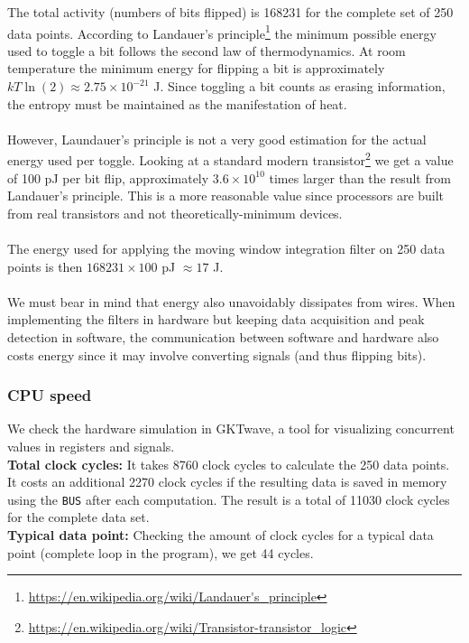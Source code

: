 The total activity (numbers of bits flipped) is 168231 for the complete set of 250 data points. According to Landauer's principle\footnote{\url{https://en.wikipedia.org/wiki/Landauer's_principle}} the minimum possible energy used to toggle a bit follows the second law of thermodynamics. At room temperature the minimum energy for flipping a bit is approximately $kT \ln(2) \approx 2.75 \times 10^{-21}$ J. Since toggling a bit counts as erasing information, the entropy must be maintained as the manifestation of heat. \\
\\
However, Laundauer's principle is not a very good estimation for the actual energy used per toggle. Looking at a standard modern transistor\footnote{\url{https://en.wikipedia.org/wiki/Transistor-transistor_logic}} we get a value of 100 pJ per bit flip, approximately $3.6 \times 10^{10}$ times larger than the result from Landauer's principle.
This is a more reasonable value since processors are built from real transistors and not theoretically-minimum devices. \\
\\
The energy used for applying the moving window integration filter on 250 data points is then $168231 \times 100$ pJ $\approx 17$ \si{\micro}{J}. \\
\\
We must bear in mind that energy also unavoidably dissipates from wires. When implementing the filters in hardware but keeping data acquisition and peak detection in software, the communication between software and hardware also costs energy since it may involve converting signals (and thus flipping bits).

\subsubsection{CPU speed}
\label{sec:cpuSpeed}

We check the hardware simulation in GKTwave, a tool for visualizing concurrent values in registers and signals.\\

\textbf{Total clock cycles:} It takes 8760 clock cycles to calculate the 250 data points. It costs an additional 2270 clock cycles if the resulting data is saved in memory using the \texttt{BUS} after each computation. The result is a total of 11030 clock cycles for the complete data set. \\

\textbf{Typical data point:} Checking the amount of clock cycles for a typical data point (complete loop in the program), we get 44 cycles. \\

